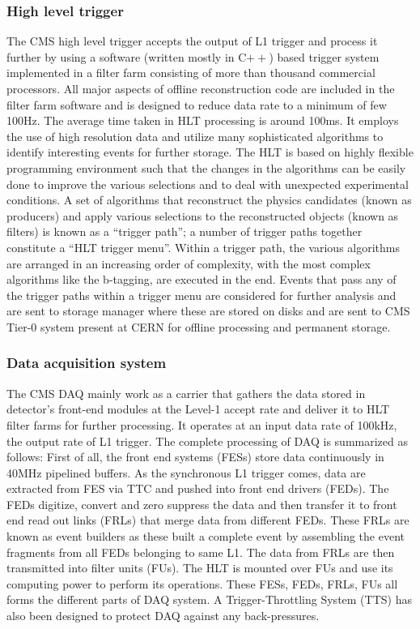 \subsubsection{High level trigger}
The CMS high level trigger accepts the output of L1 trigger and process it further by using a software (written mostly in C$++$)
based trigger system implemented in a filter farm consisting of more than thousand commercial processors. All major aspects of offline reconstruction code
are included in the filter farm software and is designed to reduce data rate to a minimum of few 100\unit{Hz}.
The average time taken in HLT processing is around 100\unit{ms}.
It employs the use of high resolution data and utilize many sophisticated algorithms to identify interesting events for
further storage. The HLT is based on highly flexible programming environment such that
the changes in the algorithms can be easily done to improve the various selections and to deal with unexpected experimental conditions.  
A set of algorithms that reconstruct the physics candidates (known as producers) and apply various selections to the reconstructed objects
(known as filters) is known as a ``trigger path''; a number of trigger paths together constitute a ``HLT trigger menu''.
Within a trigger path, the various algorithms are arranged in an increasing order of complexity, with the most complex algorithms like the b-tagging, are executed 
in the end. Events that pass any of the trigger paths within a trigger menu are considered for further analysis and are sent to storage manager where
these are stored on disks and are sent to CMS Tier-0 system present at CERN for offline processing and permanent storage.

\subsubsection{Data acquisition system}
The CMS DAQ mainly work as a carrier that gathers the data stored in detector's front-end modules at the Level-1 accept rate
and deliver it to HLT filter farms for further processing. 
It operates at an input data rate of 100\unit{kHz}, the output rate of L1 trigger. The complete processing of DAQ is summarized as follows:
First of all, the front end systems (FESs) store data continuously in 40\unit{MHz} pipelined buffers. As the synchronous L1 trigger comes, data are extracted
from FES via TTC and pushed into front end drivers (FEDs). The FEDs digitize, convert and zero suppress the data and then transfer it to
front end read out links (FRLs) that merge data from different FEDs. These FRLs are known as event builders as these built a complete event by assembling
the event fragments from all FEDs belonging to same L1. The data from FRLs are then transmitted into filter units (FUs). The HLT is mounted over FUs and use
its computing power to perform its operations. These FESs, FEDs, FRLs, FUs all forms the different parts of DAQ system. A Trigger-Throttling System (TTS)
has also been designed to protect DAQ against any back-pressures. 
